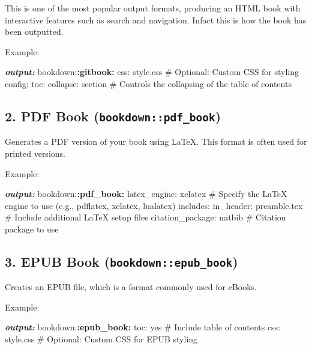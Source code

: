 \documentclass[
]{book}
\newenvironment{Shaded}{\begin{snugshade}}{\end{snugshade}}
\newcommand{\AnnotationTok}[1]{\textcolor[rgb]{0.56,0.35,0.01}{\textbf{\textit{#1}}}}
\newcommand{\NormalTok}[1]{#1}
\newcommand{\SpecialCharTok}[1]{\textcolor[rgb]{0.81,0.36,0.00}{\textbf{#1}}}
\theoremstyle{definition}
\theoremstyle{definition}
\theoremstyle{definition}
\theoremstyle{definition}
\theoremstyle{remark}
\begin{document}
This is one of the most popular output formats, producing an HTML book with interactive features such as search and navigation. Infact this is how the book has been outputted.

Example:

\begin{Shaded}
\begin{Highlighting}[]
\AnnotationTok{output:}
\NormalTok{  bookdown:}\SpecialCharTok{:gitbook:}
\NormalTok{    css: style.css  \# Optional: Custom CSS for styling}
\NormalTok{    config:}
\NormalTok{      toc:}
\NormalTok{        collapse: section  \# Controls the collapsing of the table of contents}
\end{Highlighting}
\end{Shaded}

\subsection{\texorpdfstring{2. PDF Book (\texttt{bookdown::pdf\_book})}{2. PDF Book (bookdown::pdf\_book)}}\label{pdf-book-bookdownpdf_book}

Generates a PDF version of your book using LaTeX. This format is often used for printed versions.

Example:

\begin{Shaded}
\begin{Highlighting}[]
\AnnotationTok{output:}
\NormalTok{  bookdown:}\SpecialCharTok{:pdf\_book:}
\NormalTok{    latex\_engine: xelatex  \# Specify the LaTeX engine to use (e.g., pdflatex, xelatex, lualatex)}
\NormalTok{    includes:}
\NormalTok{      in\_header: preamble.tex  \# Include additional LaTeX setup files}
\NormalTok{    citation\_package: natbib  \# Citation package to use}
\end{Highlighting}
\end{Shaded}

\subsection{\texorpdfstring{3. EPUB Book (\texttt{bookdown::epub\_book})}{3. EPUB Book (bookdown::epub\_book)}}\label{epub-book-bookdownepub_book}

Creates an EPUB file, which is a format commonly used for eBooks.

Example:

\begin{Shaded}
\begin{Highlighting}[]
\AnnotationTok{output:}
\NormalTok{  bookdown:}\SpecialCharTok{:epub\_book:}
\NormalTok{    toc: yes  \# Include table of contents}
\NormalTok{    css: style.css  \# Optional: Custom CSS for EPUB styling}
\end{Highlighting}
\end{Shaded}
\end{document}
